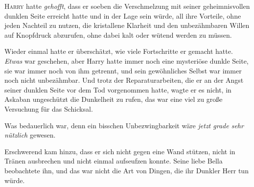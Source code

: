 
\lettrine{H}{arry} hatte \emph{gehofft}, dass er soeben die Verschmelzung mit seiner geheimnisvollen dunklen Seite erreicht hatte und in der Lage sein würde, all ihre Vorteile, ohne jeden Nachteil zu nutzen, die kristallene Klarheit und den unbezähmbaren Willen auf Knopfdruck abzurufen, ohne dabei kalt oder wütend werden zu müssen.

Wieder einmal hatte er überschätzt, wie viele Fortschritte er gemacht hatte. \emph{Etwas} war geschehen, aber Harry hatte immer noch eine mysteriöse dunkle Seite, sie war immer noch von ihm getrennt, und sein gewöhnliches Selbst war immer noch nicht unbezähmbar. Und trotz der Reparaturarbeiten, die er an der Angst seiner dunklen Seite vor dem Tod vorgenommen hatte, wagte er es nicht, in Askaban ungeschützt die Dunkelheit zu rufen, das war eine viel zu große Versuchung für das Schicksal.

Was bedauerlich war, denn ein bisschen Unbezwingbarkeit wäre \emph{jetzt grade sehr nützlich} gewesen.

Erschwerend kam hinzu, dass er sich nicht gegen eine Wand stützen, nicht in Tränen ausbrechen und nicht einmal aufseufzen konnte. Seine liebe Bella beobachtete ihn, und das war nicht die Art von Dingen, die ihr Dunkler Herr tun würde.

